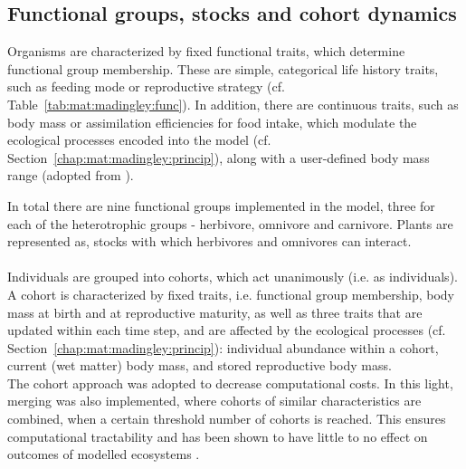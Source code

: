 \subsection{Functional groups, stocks and cohort dynamics}
\label{chap:mat:madingley:func}
%
Organisms are characterized by fixed functional traits, which determine functional group membership. These are simple, categorical life history traits, such as feeding mode or reproductive strategy (cf. Table~\ref{tab:mat:madingley:func}). In addition, there are continuous traits, such as body mass or assimilation efficiencies for food intake, which modulate the ecological processes encoded into the model (cf. Section~\ref{chap:mat:madingley:princip}), along with a user-defined body mass range (adopted from \citealp{Harfoot2014}).

In total there are nine functional groups implemented in the model, three for each of the heterotrophic groups - herbivore, omnivore and carnivore. Plants are represented as, stocks with which herbivores and omnivores can interact.\\\\
 Individuals are grouped into cohorts, which act unanimously (i.e. as individuals).  A cohort is characterized by fixed traits, i.e. functional group membership, body mass at birth and at reproductive maturity, as well as three traits that are updated within each time step, and are affected by the ecological processes (cf. Section~\ref{chap:mat:madingley:princip}): individual abundance within a cohort, current (wet matter) body mass, and stored reproductive body mass. \\
 The cohort approach was adopted to decrease computational costs. In this light, merging was also implemented, where cohorts of similar characteristics are combined, when a certain threshold number of cohorts is reached. This ensures computational tractability and has been shown to have little to no effect on outcomes of modelled ecosystems \citep[cf.][]{Harfoot2014}.
 \clearpage
